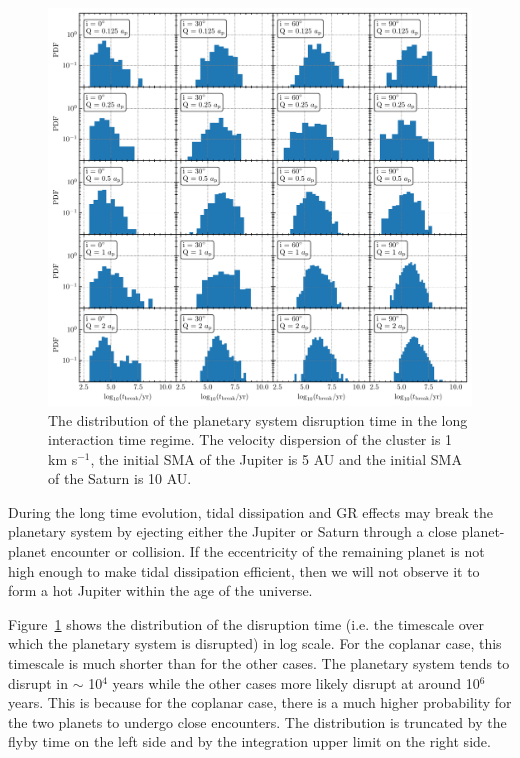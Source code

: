 \documentclass[twocolumn]{aastex63}
\newcommand*\fgr[1]{Figure~\ref{#1}}
\begin{document}
\begin{figure}
    \includegraphics[width=\textwidth]{figs/break_std.pdf}
    \caption{The distribution of the planetary system disruption time in the long interaction time regime. The velocity dispersion of the cluster is 1 km s$^{-1}$, the initial SMA of the Jupiter is 5 AU and the initial SMA of the Saturn is 10 AU.}
    \label{fig:tbreak}
\end{figure}

During the long time evolution, tidal dissipation and GR effects may break the planetary system by ejecting either the Jupiter or Saturn through a close planet-planet encounter or collision. If the eccentricity of the remaining planet is not high enough to make tidal dissipation efficient, then we will not observe it to form a hot Jupiter within the age of the universe.

\fgr{fig:tbreak} shows the distribution of the disruption time (i.e. the timescale over which the planetary system is disrupted) in log scale. For the coplanar case, this timescale is much shorter than for the other cases. The planetary system tends to disrupt in $\sim$ 10$^4$ years while the other cases more likely disrupt at around 10$^6$ years. This is because for the coplanar case, there is a much higher probability for the two planets to undergo close encounters. The distribution is truncated by the flyby time on the left side and by the integration upper limit on the right side.
\end{document}
